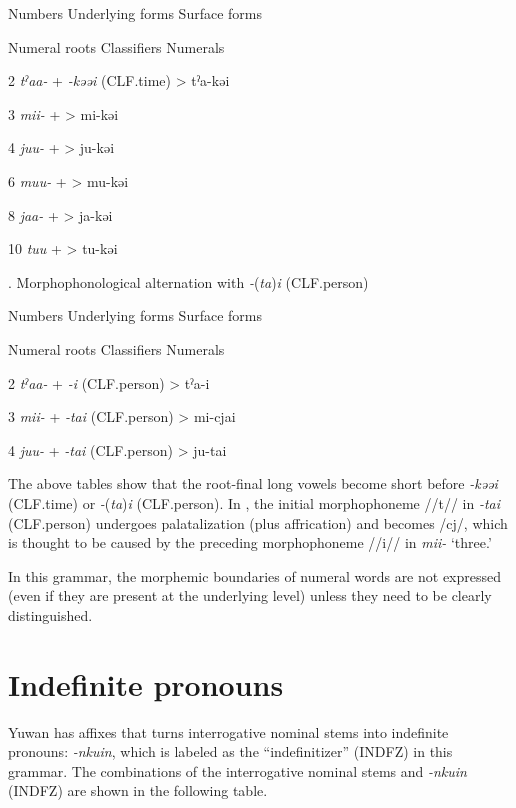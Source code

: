Numbers  Underlying forms    Surface forms

  Numeral roots    Classifiers    Numerals

2  \textit{tˀaa-}  +  \textit{{}-kəəi} (CLF.time)  >  tˀa-kəi

3  \textit{mii-}  +    >  mi-kəi

4  \textit{juu-}  +    >  ju-kəi

6  \textit{muu-}  +    >  mu-kəi

8  \textit{jaa-}  +    >  ja-kəi

10  \textit{tuu}  +    >  tu-kəi

\begin{styleBeschriftung}
\textmd{}\textmd{. Morphophonological alternation with} \textmd{\textit{{}-}}\textmd{(}\textmd{\textit{ta}}\textmd{)}\textmd{\textit{i}}\textmd{ (CLF.person)}
\end{styleBeschriftung}

Numbers  Underlying forms    Surface forms

  Numeral roots    Classifiers    Numerals

2  \textit{tˀaa-}  +  \textit{{}-i} (CLF.person)  >  tˀa-i

3  \textit{mii-}  +  \textit{{}-tai} (CLF.person)  >  mi-cjai

4  \textit{juu-}  +  \textit{{}-tai} (CLF.person)  >  ju-tai

The above tables show that the root-final long vowels become short before \textit{{}-kəəi} (CLF.time) or \textit{{}-}(\textit{ta})\textit{i} (CLF.person). In , the initial morphophoneme //t// in \textit{{}-tai} (CLF.person) undergoes palatalization (plus affrication) and becomes /cj/, which is thought to be caused by the preceding morphophoneme //i// in \textit{mii-} ‘three.’

In this grammar, the morphemic boundaries of numeral words are not expressed (even if they are present at the underlying level) unless they need to be clearly distinguished.

\section{Indefinite pronouns}

Yuwan has affixes that turns interrogative nominal stems into indefinite pronouns: \textit{{}-nkuin}, which is labeled as the “indefinitizer” (INDFZ) in this grammar. The combinations of the interrogative nominal stems and \textit{-nkuin} (INDFZ) are shown in the following table.

